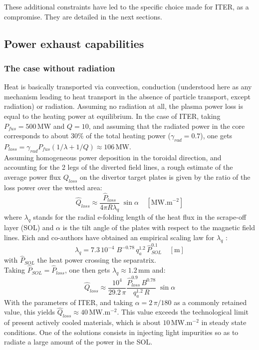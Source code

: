 These additional constraints have led to the specific choice made for ITER, as a compromise. They are detailed in the next sections.


\subsection{Power exhaust capabilities}
\label{sec:power_exhaust}

\subsubsection*{The case without radiation}

Heat is basically transported via convection, conduction (understood here as any mechanism leading to heat transport in the absence of particle transport, except radiation) or radiation. 
Assuming no radiation at all, the plasma power loss is equal to the heating power at equilibrium. In the case of ITER, taking $P_{fus}=500\,$MW and $Q=10$, and assuming that the radiated power in the core corresponds to about $30\%$ of the total heating power ($\gamma_{rad}=0.7$), one gets $P_{loss} = \gamma_{rad} P_{fus}(1/\lambda + 1/Q) \approx 106\,$MW. \\

Assuming homogeneous power deposition in the toroidal direction, and accounting for the 2 legs of the diverted field lines, a rough estimate of the average power flux $Q_{loss}$ on the divertor target plates is given by the ratio of the loss power over the wetted area:
\begin{equation}
	\hat Q_{loss} \approx \frac{\hat P_{loss}}{4\pi R \lambda_q} \;\sin\alpha \;\;\;\; [\textrm{MW.m}^{-2}]
\end{equation}
where $\lambda_q$ stands for the radial e-folding length of the heat flux in the scrape-off layer (SOL) and $\alpha$ is the tilt angle of the plates with respect to the magnetic field lines.
Eich and co-authors have obtained an empirical scaling law for $\lambda_q$ :
\begin{equation}
	\lambda_q = 7.3\,10^{-4}\; B^{-0.78} \, q_{a}^{1.2} \, \hat P_{SOL}^{0.1}\;\;\;\; [\textrm{m}]
\end{equation}
with $\hat P_{SOL}$ the heat power crossing the separatrix.\\

Taking $\hat P_{SOL} = \hat P_{loss}$, one then gets $\lambda_q \approx 1.2\,$mm and:
\begin{equation*}
	\hat Q_{loss} \approx \frac{10^4}{29.2\, \pi} 
	\frac{\hat P_{loss}^{0.9} \, B^{0.78}}{q_a^{1.2} \, R} \;\sin\alpha
\end{equation*}
With the parameters of ITER, and taking $\alpha = 2\, \pi/180$ as a commonly retained value, this yields $\hat Q_{loss} \approx 40\,$MW.m$^{-2}$. This value exceeds the technological limit of present actively cooled materials, which is about $10\,$MW.m$^{-2}$ in steady state conditions. One of the solutions consists in injecting light impurities so as to radiate a large amount of the power in the SOL.




